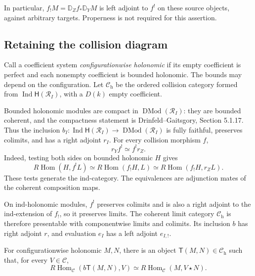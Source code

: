 In particular,
$f_!M=\mathbb D_Zf_*\mathbb D_YM$
is left adjoint to $f^!$ on these
source objects, against arbitrary
targets. Properness is not required
for this assertion.

\subsection{Retaining the collision diagram}
\label{v4-arith:centers:subsec:holonomic-diagram}

Call a coefficient system
\emph{configurationwise holonomic} if
its empty coefficient is perfect and
each nonempty coefficient is bounded
holonomic. The bounds may depend on
the configuration.
Let $\mathcal C_{\mathrm h}$ be the
ordered collision category formed
from $\operatorname{Ind}\mathsf H(\mathscr R_I)$,
with a $D(k)$ empty coefficient.

Bounded holonomic modules are compact
in $\operatorname{DMod}(\mathscr R_I)$:
they are bounded coherent, and the
compactness statement is
Drinfeld--Gaitsgory, Section 5.1.17.
Thus the inclusion
$b_I:\operatorname{Ind}\mathsf H(\mathscr R_I)
\to\operatorname{DMod}(\mathscr R_I)$
is fully faithful, preserves colimits,
and has a right adjoint $r_I$.
For every collision morphism $f$,
\[
 r_Yf^!\simeq f^!r_Z.
\]
Indeed, testing both sides on bounded
holonomic $H$ gives
\[
 R\operatorname{Hom}(H,f^!L)
 \simeq R\operatorname{Hom}(f_!H,L)
 \simeq R\operatorname{Hom}(f_!H,r_ZL).
\]
These tests generate the ind-category.
The equivalences are adjunction mates
of the coherent composition maps.

On ind-holonomic modules, $f^!$
preserves colimits and is also a
right adjoint to the ind-extension
of $f_!$, so it preserves limits.
The coherent limit category
$\mathcal C_{\mathrm h}$ is therefore
presentable with componentwise limits
and colimits. Its inclusion $b$ has
right adjoint $r$, and evaluation
$e_I$ has a left adjoint $e_{I,!}$.

\begin{proposition}\label{v4-arith:centers:prop:holonomic-cohom}
For configurationwise holonomic
$M,N$, there is an object
$\mathsf T(M,N)\in\mathcal C_{\mathrm h}$
such that, for every $V\in\mathcal C$,
\[
 R\operatorname{Hom}_{\mathcal C}
       (b\mathsf T(M,N),V)
 \simeq
 R\operatorname{Hom}_{\mathcal C}
       (M,V\star N).
\]
\end{proposition}


